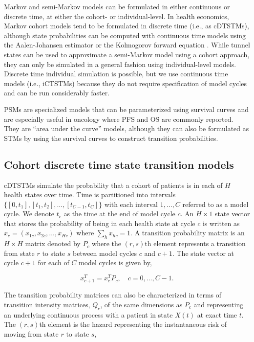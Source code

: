 \documentclass[article, nojss]{jss}\usepackage[]{graphicx}\usepackage[]{color}
\begin{document}
Markov and semi-Markov models can be formulated in either continuous or discrete time, at either the cohort- or individual-level. In health economics, Markov cohort models tend to be formulated in discrete time (i.e., as cDTSTMs), although state probabilities can be computed with continuous time models using the Aalen-Johansen estimator \citep{aalen1978empirical} or the Kolmogorov forward equation \citep{cox1977theory}. While tunnel states can be used to approximate a semi-Markov model using a cohort approach, they can only be simulated in a general fashion using individual-level models. Discrete time individual simulation is possible, but we use continuous time models (i.e., iCTSTMs) because they do not require specification of model cycles and can be run considerably faster. 

PSMs are specialized models that can be parameterized using survival curves and are especially useful in oncology where PFS and OS are commonly reported. They are ``area under the curve'' models, although they can also be formulated as STMs by using the survival curves to construct transition probabilities. 

\subsection{Cohort discrete time state transition models} \label{sec:cDTSTMs}
cDTSTMs simulate the probability that a cohort of patients is in each of $H$ health states over time. Time is partitioned into intervals $\{[0, t_1], [t_1, t_2], \ldots, [t_{C-1}, t_C]\}$ with each interval $1,\ldots, C$ referred to as a model cycle. We denote $t_c$ as the time at the end of model cycle $c$. An $H \times 1$ state vector that stores the probability of being in each health state at cycle $c$ is written as $x_c = (x_{1c}, x_{2c}, \ldots, x_{Hc})$ where $\sum_h x_{hc} = 1$. A transition probability matrix is an $H \times H$ matrix denoted by $P_c$ where the $(r,s)$th element represents a transition from state $r$ to state $s$ between model cycles $c$ and $c+1$. The state vector at cycle $c+1$ for each of $C$ model cycles is given by, 

\begin{equation} \label{eqn:markov-sim}
x_{c+1}^T= x_c^T P_c, \quad c = 0,\ldots, C-1.
\end{equation}

The transition probability matrices can also be characterized in terms of transition intensity matrices, $Q_c$, of the same dimensions as $P_c$ and representing an underlying continuous process with a patient in state $X(t)$ at exact time $t$. The $(r,s)$th element is the hazard representing the instantaneous risk of moving from state $r$ to state $s$,
\end{document}
